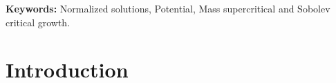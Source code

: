 \documentclass[10pt]{article}
\numberwithin{equation}{section}
\numberwithin{equation}{section}
\begin{document}
\begin{abstract}
In this paper, we consider the existence of positive solutions with prescribed $L^2$-norm for the following nonlinear Schr\"{o}dinger equation involving potential and Sobolev critical exponent
\begin{equation*}
\begin{cases}
-\Delta u+V(x)u=\lambda u+\mu |u|^{p-2}u+|u|^{\frac{4}{N-2}}u \;\;\text { in } \mathbb{R}^N, \\
\|u\|_2=a>0,\\
\end{cases}
\end{equation*}
where $N\ge 3$, $\mu>0$, $p\in [2+\frac{4}{N}, \frac{2N}{N-2})$ and $V\in C^1(\mathbb{R}^N)$. Under different assumptions on $V$, we derive two different Pohozaev identities. Based on these two cases, we respectively obtain the existence of positive solution. As far as we are aware, we did not find any works on normalized solutions with Sobolev critical growth and potential $V \not\equiv 0$. Our results extend some results of Wei and Wu [J. Funct. Anal. 283(2022)] to the potential case.
\end{abstract}
\textbf{Keywords:} Normalized solutions, Potential, Mass supercritical and Sobolev critical growth.



\section{Introduction}
\noindent
\end{document}
